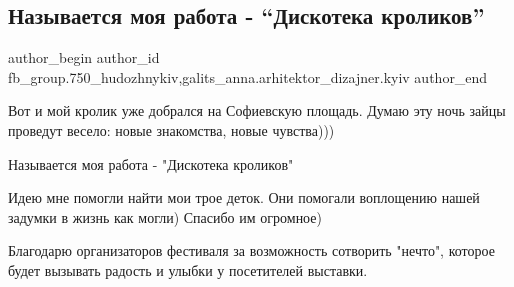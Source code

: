  
 
 
 
 

\subsection{Называется моя работа - \enquote{Дискотека кроликов}}
\label{sec:03_04_2018.fb.fb_group.750_hudozhnykiv.5.moja_rabota_diskoteka_krolikov}
 
\ifcmt
 author_begin
   author_id fb_group.750_hudozhnykiv,galits_anna.arhitektor_dizajner.kyiv
 author_end
\fi

Вот и мой кролик уже добрался на Софиевскую площадь. Думаю эту ночь зайцы
проведут весело: новые знакомства, новые чувства)))

Называется моя работа - "Дискотека кроликов"

Идею мне помогли найти мои трое деток. Они помогали воплощению нашей задумки в
жизнь как могли) Спасибо им огромное)

Благодарю организаторов фестиваля за возможность сотворить "нечто", которое
будет вызывать радость и улыбки у посетителей выставки.

